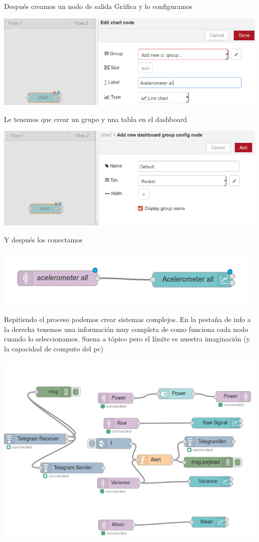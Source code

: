 \documentclass[12pt, a4paper, oneside, titlepage]{article}
\begin{document}
Después creamos un nodo de salida Gráfica y lo configuramos

\includegraphics[width=0.9\linewidth,keepaspectratio]{img/node-2.png}

Le tenemos que crear un grupo y una tabla en el dashboard

\includegraphics[width=0.9\linewidth,keepaspectratio]{img/node-3.png}

Y después los conectamos

\includegraphics[width=0.9\linewidth,keepaspectratio]{img/node-4.png}

Repitiendo el proceso podemos crear sistemas complejos.
En la pestaña de info a la derecha tenemos una información muy completa de como funciona cada nodo cuando lo seleccionamos. Suena a tópico pero el límite es nuestra imaginación (y la capacidad de computo del pc)

\includegraphics[width=0.9\linewidth,keepaspectratio]{img/node-5.png}
\end{document}

